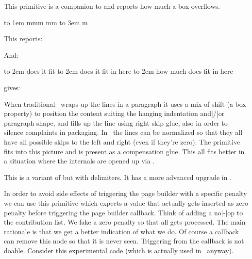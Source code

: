 \stopnewprimitive

\startnewprimitive[title={\prm {overshoot}}]

This primitive is a companion to  and reports how much a box
overflows.

\startbuffer
{}\hbox to 1em {mmm} \the\badness\quad\the\overshoot
{}\hbox         {mm} \the\badness\quad\the\overshoot
{}\hbox to 3em   {m} \the\badness\quad\the\overshoot
\stopbuffer

\typebuffer

This reports:

\startlines
\getbuffer
\stoplines

And:

\startbuffer
\hbox to 2cm {does it fit}               \the\overshoot
\hbox to 2cm {does it fit in here}       \the\overshoot
\hbox to 2cm {how much does fit in here} \the\overshoot
\stopbuffer

\typebuffer

gives:

\startlines
\getbuffer
\stoplines

When traditional \TEX\ wraps up the lines in a paragraph it uses a mix of shift
(a box property) to position the content suiting the hanging indentation and|/|or
paragraph shape, and fills up the line using right skip glue, also in order to
silence complaints in packaging. In \LUAMETATEX\ the lines can be normalized so
that they all have all possible skips to the left and right (even if they're
zero). The  primitive fits into this picture and is present as a
compensation glue. This all fits better in a situation where the internals are
opened up via \LUA.

\stopnewprimitive

\startoldprimitive[title={\prm {overwithdelims}}][obsolete=yes]

This is a variant of  but with delimiters. It has a more advanced
upgrade in .

\stopoldprimitive

\startnewprimitive[title={\prm {pageboundary}}]

In order to avoid side effects of triggering the page builder with a specific
penalty we can use this primitive which expects a value that actually gets
inserted as zero penalty before triggering the page builder callback. Think of
adding a no|-|op to the contribution list. We fake a zero penalty so that all
gets processed. The main rationale is that we get a better indication of what we
do. Of course a callback can remove this node so that it is never seen.
Triggering from the callback is not doable. Consider this experimental code
(which is actually used in \CONTEXT\ anyway).

